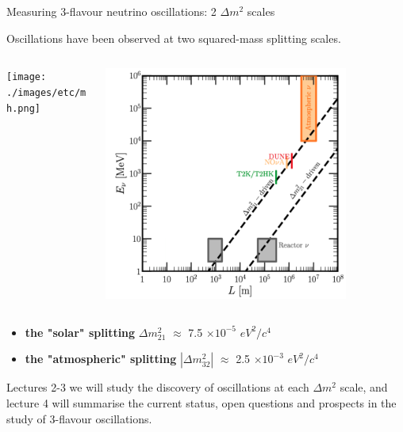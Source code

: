 %
%
%

\begin{frame}{Measuring 3-flavour neutrino oscillations: 2 $\Delta m^2$ scales}

{\small
 Oscillations have been observed at two squared-mass splitting scales.\\
}
\vspace{0.1cm}

\begin{columns}
  \begin{column}{0.50\textwidth}
    \texttt{[image: ./images/etc/mh.png]}
  \end{column}
  \begin{column}{0.50\textwidth}
    \includegraphics[width=0.80\textwidth]{./images/osc101/expt_L_E_no_sterile}
  \end{column}
\end{columns}

\begin{itemize}
    \item {\color{red} \bf the "solar" splitting}
          {\bf ${\Delta}m^{2}_{21}$ }   $\approx$ 7.5 $\times 10^{-5}$ $eV^{2}/c^{4}$\\
    \vspace{0.1cm}
    \item {\color{red} \bf the "atmospheric" splitting}
          {\bf $|{\Delta}m^{2}_{32}|$ } $\approx$ 2.5 $\times 10^{-3}$ $eV^{2}/c^{4}$\\
\end{itemize}

\vspace{-0.1cm}

\begin{block}{}
{\scriptsize
 Lectures 2-3 we will study the discovery of oscillations
 at each $\Delta m^2$ scale, and lecture 4 will summarise the current status,
 open questions and prospects in the study of 3-flavour oscillations.\\
}
\end{block}

\end{frame}

